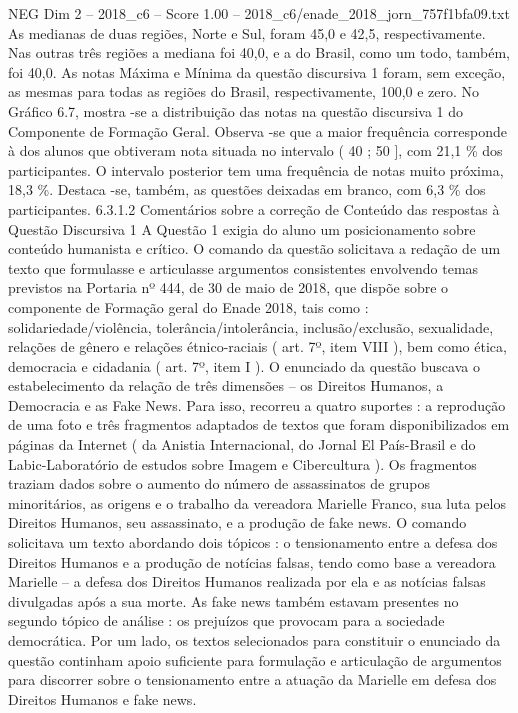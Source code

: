 \begin{textsample}{NEG Dim 2 – 2018\_c6 – Score 1.00 – 2018\_c6/enade\_2018\_jorn\_757f1bfa09.txt}
As medianas de duas regiões, Norte e Sul, foram 45,0 e 42,5, respectivamente.
Nas outras três regiões a mediana foi 40,0, e a do Brasil, como um todo, também, foi 40,0.
As notas Máxima e Mínima da questão discursiva 1 foram, sem exceção, as mesmas para todas as regiões do Brasil, respectivamente, 100,0 e zero.
No Gráfico 6.7, mostra -se a distribuição das notas na questão discursiva 1 do Componente de Formação Geral.
Observa -se que a maior frequência corresponde à dos alunos que obtiveram nota situada no intervalo ( 40 ; 50 ], com 21,1 \% dos participantes.
O intervalo posterior tem uma frequência de notas muito próxima, 18,3 \%.
Destaca -se, também, as questões deixadas em branco, com 6,3 \% dos participantes. 6.3.1.2 Comentários sobre a correção de Conteúdo das respostas à Questão Discursiva 1 A Questão 1 exigia do aluno um posicionamento sobre conteúdo humanista e crítico.
O comando da questão solicitava a redação de um texto que formulasse e articulasse argumentos consistentes envolvendo temas previstos na Portaria nº 444, de 30 de maio de 2018, que dispõe sobre o componente de Formação geral do Enade 2018, tais como : solidariedade/violência, tolerância/intolerância, inclusão/exclusão, sexualidade, relações de gênero e relações étnico-raciais ( art. 7º, item VIII ), bem como ética, democracia e cidadania ( art. 7º, item I ).
O enunciado da questão buscava o estabelecimento da relação de três dimensões – os Direitos Humanos, a Democracia e as Fake News.
Para isso, recorreu a quatro suportes : a reprodução de uma foto e três fragmentos adaptados de textos que foram disponibilizados em páginas da Internet ( da Anistia Internacional, do Jornal El País-Brasil e do Labic-Laboratório de estudos sobre Imagem e Cibercultura ).
Os fragmentos traziam dados sobre o aumento do número de assassinatos de grupos minoritários, as origens e o trabalho da vereadora Marielle Franco, sua luta pelos Direitos Humanos, seu assassinato, e a produção de fake news.
O comando solicitava um texto abordando dois tópicos : o tensionamento entre a defesa dos Direitos Humanos e a produção de notícias falsas, tendo como base a vereadora Marielle – a defesa dos Direitos Humanos realizada por ela e as notícias falsas divulgadas após a sua morte.
As fake news também estavam presentes no segundo tópico de análise : os prejuízos que provocam para a sociedade democrática.
Por um lado, os textos selecionados para constituir o enunciado da questão continham apoio suficiente para formulação e articulação de argumentos para discorrer sobre o tensionamento entre a atuação da Marielle em defesa dos Direitos Humanos e fake news.

\end{textsample}
